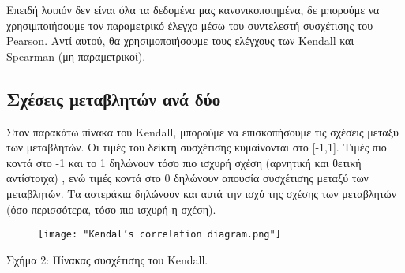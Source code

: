 \documentclass[10pt]{article}
\begin{document}
Επειδή λοιπόν δεν είναι όλα τα δεδομένα μας κανονικοποιημένα, δε μπορούμε να χρησιμποιήσουμε τον παραμετρικό έλεγχο μέσω του συντελεστή συσχέτισης του Pearson. Αντί αυτού, θα χρησιμοποιήσουμε τους ελέγχους των Kendall και Spearman (μη παραμετρικοί).

\subsection {  Σχέσεις μεταβλητών ανά δύο}

Στον παρακάτω πίνακα του Κendall, μπορούμε να επισκοπήσουμε τις σχέσεις μεταξύ των μεταβλητών. Οι τιμές του δείκτη συσχέτισης κυμαίνονται στο [-1,1]. Τιμές πιο κοντά στο -1 και το 1 δηλώνουν τόσο πιο ισχυρή σχέση (αρνητική και θετική αντίστοιχα) , ενώ τιμές κοντά στο 0 δηλώνουν απουσία συσχέτισης μεταξύ των μεταβλητών. Τα αστεράκια δηλώνουν και αυτά την ισχύ της σχέσης των μεταβλητών (όσο περισσότερα, τόσο πιο ισχυρή η σχέση).

\begin{figure}[H]
    \centering
    \texttt{[image: "Kendal's correlation diagram.png"]}
    
    \label{fig:galaxy}
\end{figure}

\begin{centering}

\renewcommand{\caption}{Σχήμα 2: }
\caption { Πίνακας συσχέτισης του Kendall. }
\end{centering}
\end{document}
